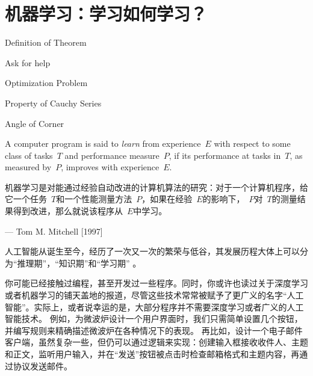 \chapter{机器学习：学习如何学习？}\label{ch:机器学习}

 \begin{introduction}
  \item Definition of Theorem
  \item Ask for help
  \item Optimization Problem
  \item Property of Cauchy Series
  \item Angle of Corner
\end{introduction}

A computer program is said to {\em learn} from experience~$ E$ with respect to some class of tasks~$T$ and performance measure~$P$, if its performance at tasks in~$T$, as measured by~$P$, improves with experience~$E$.

机器学习是对能通过经验自动改进的计算机算法的研究：对于一个计算机程序，给它一个任务~$T$和一个性能测量方法~$P$，如果在经验~$E$的影响下，~$P$对~$T$的测量结果得到改进，那么就说该程序从~$E$中学习。
\begin{flushright}
— Tom M. Mitchell  [1997]
\end{flushright}

人工智能从诞生至今，经历了一次又一次的繁荣与低谷，其发展历程大体上可以分为“推理期”，“知识期”和“学习期”%
\cite{WangJue2006MachineLearning}。

%
%
%

你可能已经接触过编程，甚至开发过一些程序。同时，你或许也读过关于深度学习或者机器学习的铺天盖地的报道，尽管这些技术常常被赋予了更广义的名字“人工智能”。实际上，或者说幸运的是，大部分程序并不需要深度学习或者广义的人工智能技术。
例如，为微波炉设计一个用户界面时，我们只需简单设置几个按钮，并编写规则来精确描述微波炉在各种情况下的表现。
再比如，设计一个电子邮件客户端，虽然复杂一些，但仍可以通过逻辑来实现：创建输入框接收收件人、主题和正文，监听用户输入，并在“发送”按钮被点击时检查邮箱格式和主题内容，再通过协议发送邮件。


